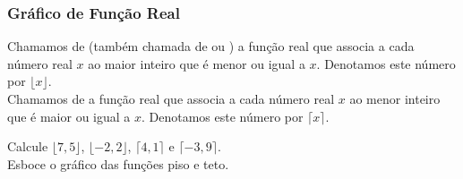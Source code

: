     \begin{frame}
        \frametitle{Gráfico de Função Real} 
        
        \begin{definicao}
            Chamamos de  (também chamada de  ou ) a função real que associa a cada número real $x$ ao maior inteiro que é menor ou igual a $x$. Denotamos este número por $\lfloor x \rfloor$.\\
            Chamamos de  a função real que associa a cada número real $x$ ao menor inteiro que é maior ou igual a $x$. Denotamos este número por $\lceil x \rceil$.
        \end{definicao} \pause

        \begin{exemplo}
            Calcule $\lfloor 7{,}5 \rfloor$, $\lfloor -2{,}2 \rfloor$, $\lceil 4{,}1 \rceil$ e $\lceil -3{,}9 \rceil$.\\
        Esboce o gráfico das funções piso e teto.
        \end{exemplo}
        
        \end{frame}
        
        
